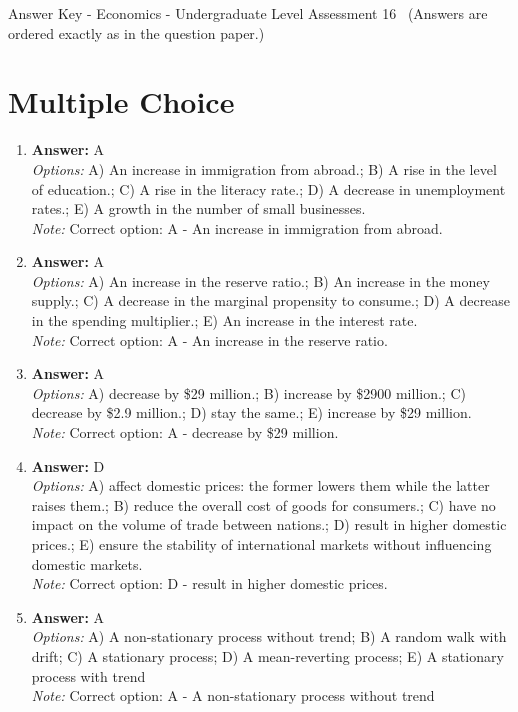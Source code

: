 \documentclass[12pt]{article}
\begin{document}
\begin{center}
Answer Key - Economics - Undergraduate Level Assessment 16 \
\small (Answers are ordered exactly as in the question paper.)
\end{center}

\section*{Multiple Choice}
\begin{enumerate}[label=\arabic*.]
\item \textbf{Answer:} A
\\ \textit{Options:} A) An increase in immigration from abroad.; B) A rise in the level of education.; C) A rise in the literacy rate.; D) A decrease in unemployment rates.; E) A growth in the number of small businesses.
\\ \textit{Note:} Correct option: A - An increase in immigration from abroad.
\item \textbf{Answer:} A
\\ \textit{Options:} A) An increase in the reserve ratio.; B) An increase in the money supply.; C) A decrease in the marginal propensity to consume.; D) A decrease in the spending multiplier.; E) An increase in the interest rate.
\\ \textit{Note:} Correct option: A - An increase in the reserve ratio.
\item \textbf{Answer:} A
\\ \textit{Options:} A) decrease by \$29 million.; B) increase by \$2900 million.; C) decrease by \$2.9 million.; D) stay the same.; E) increase by \$29 million.
\\ \textit{Note:} Correct option: A - decrease by \$29 million.
\item \textbf{Answer:} D
\\ \textit{Options:} A) affect domestic prices: the former lowers them while the latter raises them.; B) reduce the overall cost of goods for consumers.; C) have no impact on the volume of trade between nations.; D) result in higher domestic prices.; E) ensure the stability of international markets without influencing domestic markets.
\\ \textit{Note:} Correct option: D - result in higher domestic prices.
\item \textbf{Answer:} A
\\ \textit{Options:} A) A non-stationary process without trend; B) A random walk with drift; C) A stationary process; D) A mean-reverting process; E) A stationary process with trend
\\ \textit{Note:} Correct option: A - A non-stationary process without trend
\end{enumerate}
\end{document}
